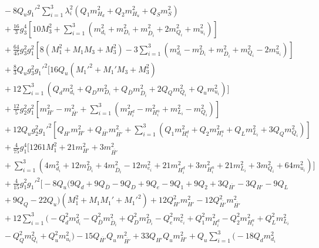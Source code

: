 \documentclass[preprint,amsmath,amssymb,aps,superscriptaddress,prd,
showpacs,floatfix,nofootinbib]{revtex4-1}
\begin{document}
\begin{subequations}
\begin{align}
& {} - 8 Q_u g_1'^2 \sum_{i=1}^3 \lambda_i^2 \left ( Q_1 m_{H_d}^2 +
Q_2 m_{H_u}^2 + Q_S m_S^2 \right ) \nonumber \\
& {} + \frac{16}{3} g_3^4 \left [ 10 M_3^2 + \sum_{i=1}^3 \left ( m_{d_i}^2
+ m_{D_i}^2 + m_{\overline{D}_i}^2 + 2 m_{Q_i}^2 + m_{u_i}^2 \right )
\right ] \nonumber \\
& {} + \frac{64}{45} g_3^2 g_1^2 \left [ 8 \left ( M_1^2 + M_1 M_3 + M_3^2
\right ) - 3 \sum_{i=1}^3 \left ( m_{d_i}^2 - m_{D_i}^2 +
m_{\overline{D}_i}^2 + m_{Q_i}^2 - 2 m_{u_i}^2 \right ) \right ] \nonumber \\
& {} + \frac{8}{3} Q_u g_3^2 g_1'^2 \bigg [ 16 Q_u \left ( M_1'^2 + M_1' M_3 +
M_3^2 \right ) \nonumber \\
& {} + 12 \sum_{i=1}^3 \left ( Q_d m_{d_i}^2 + Q_D m_{D_i}^2 +
Q_{\overline{D}} m_{\overline{D}_i}^2 + 2 Q_Q m_{Q_i}^2 + Q_u m_{u_i}^2
\right ) \bigg ] \nonumber \\
& {} + \frac{12}{5} g_2^2 g_1^2 \left [ m_{H'}^2 - m_{\overline{H'}}^2 +
\sum_{i=1}^3 \left ( m_{H_i^d}^2 - m_{H_i^u}^2 + m_{L_i}^2 - m_{Q_i}^2
\right ) \right ] \nonumber \\
& {} + 12 Q_u g_2^2 g_1'^2 \left [ Q_{H'} m_{H'}^2 +
Q_{\overline{H'}} m_{\overline{H'}}^2 + \sum_{i=1}^3 \left ( Q_1 m_{H_i^d}^2
+ Q_2 m_{H_i^u}^2 + Q_L m_{L_i}^2 + 3 Q_Q m_{Q_i}^2 \right ) \right ]
\nonumber \\
& {} + \frac{4}{75} g_1^4 \bigg [ 1261 M_1^2 + 21 m_{H'}^2 +
3 m_{\overline{H'}}^2 \nonumber \\
& {} + \sum_{i=1}^3 \left ( 4 m_{d_i}^2 + 12 m_{D_i}^2 +
4 m_{\overline{D}_i}^2 - 12 m_{e_i}^2 + 21 m_{H_i^d}^2 + 3 m_{H_i^u}^2 +
21 m_{L_i}^2 + 3 m_{Q_i}^2 + 64 m_{u_i}^2 \right ) \bigg ] \nonumber \\
& {} + \frac{4}{15} g_1^2g_1'^2 \bigg [ -8 Q_u \big ( 9 Q_d +
9 Q_{\overline{D}} - 9 Q_D + 9 Q_e - 9 Q_1 + 9 Q_2 + 3Q_{\overline{H'}} -
3 Q_{H'} - 9 Q_L \nonumber \\
& {} + 9 Q_Q - 22 Q_u \big ) \left ( M_1^2 + M_1 M_1' + M_1'^2 \right ) +
12 Q_{H'}^2 m_{H'}^2 - 12 Q_{\overline{H'}}^2 m_{\overline{H'}}^2 \nonumber \\
& {} + 12 \sum_{i=1}^3 \big ( -Q_d^2 m_{d_i}^2 -
Q_{\overline{D}}^2 m_{\overline{D}_i}^2 + Q_D^2 m_{D_i}^2 - Q_e^2 m_{e_i}^2 +
Q_1^2 m_{H_i^d}^2 - Q_2^2 m_{H_i^u}^2 + Q_L^2 m_{L_i}^2 \nonumber \\
& {} - Q_Q^2 m_{Q_i}^2 + Q_u^2 m_{u_i}^2 \big ) -
15 Q_{\overline{H'}} Q_u m_{\overline{H'}}^2 + 33 Q_{H'} Q_u m_{H'}^2 +
Q_u \sum_{i=1}^3 \big ( -18 Q_d m_{d_i}^2 \nonumber \\

\end{align}
\end{subequations}
\end{document}
